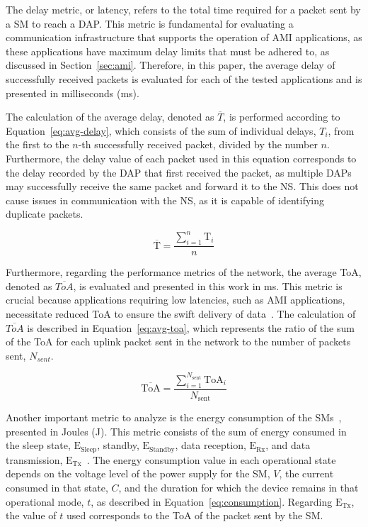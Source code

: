 \documentclass[a4paper,fleqn]{cas-dc}
\begin{document}
The delay metric, or latency, refers to the total time required for a packet sent by a SM to reach a DAP. This metric is fundamental for evaluating a communication infrastructure that supports the operation of \gls{AMI} applications, as these applications have maximum delay limits that must be adhered to, as discussed in Section~\ref{sec:ami}. Therefore, in this paper, the average delay of successfully received packets is evaluated for each of the tested applications and is presented in milliseconds (ms).

The calculation of the average delay, denoted as \( \overline{T} \), is performed according to Equation~\ref{eq:avg-delay}, which consists of the sum of individual delays, \( T_{i} \), from the first to the \( n \)-th successfully received packet, divided by the number \( n \). Furthermore, the delay value of each packet used in this equation corresponds to the delay recorded by the DAP that first received the packet, as multiple \gls{DAPs} may successfully receive the same packet and forward it to the \gls{NS}. This does not cause issues in communication with the \gls{NS}, as it is capable of identifying duplicate packets.


\begin{equation} \label{eq:avg-delay}
    \overline{\text{T}} = \frac{\sum \limits_{i=1}^{n} \text{T}_{i}}{n}
\end{equation}

Furthermore, regarding the performance metrics of the network, the average \gls{ToA}, denoted as \( \overline{ToA} \), is evaluated and presented in this work in ms. This metric is crucial because applications requiring low latencies, such as \gls{AMI} applications, necessitate reduced \gls{ToA} to ensure the swift delivery of data~\cite{lima2021adaptive}. The calculation of~\(\overline{ToA}\) is described in Equation~\ref{eq:avg-toa}, which represents the ratio of the sum of the \gls{ToA} for each uplink packet sent in the network to the number of packets sent, \( N_{sent} \).

\begin{equation} \label{eq:avg-toa}
    \overline{\text{ToA}} = \frac{\sum\limits_{i=1}^{N_{\text{sent}}} \text{ToA}_{i}}{N_{\text{sent}}}
\end{equation}

Another important metric to analyze is the energy consumption of the \gls{SMs}~\cite{mhatre2023frequency}, presented in Joules (J). This metric consists of the sum of energy consumed in the sleep state, \( \text{E}_{\text{Sleep}} \), standby, \( \text{E}_{\text{Standby}} \), data reception, \( \text{E}_{\text{Rx}} \), and data transmission, \( \text{E}_{\text{Tx}} \)~\cite{magrin2020lora}. The energy consumption value in each operational state depends on the voltage level of the power supply for the SM, \( V \), the current consumed in that state, \( C \), and the duration for which the device remains in that operational mode, \( t \), as described in Equation~\ref{eq:consumption}. Regarding \( \text{E}_{\text{Tx}} \), the value of \( t \) used corresponds to the \gls{ToA} of the packet sent by the SM.
\end{document}
